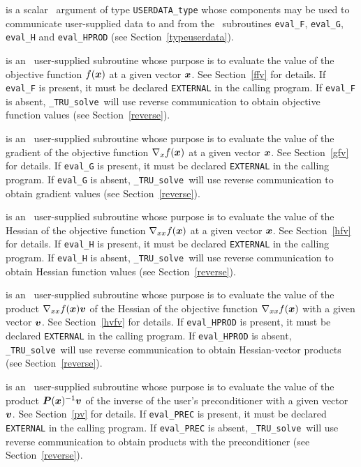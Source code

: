 \documentclass{galahad}
\newcommand{\packagename}{TRU}
\newcommand{\fullpackagename}{\libraryname\_\packagename}
\newcommand{\solver}{{\tt \fullpackagename\_solve}}
\begin{document}
\begin{description}
 is a scalar \intentinout\ argument of type
{\tt USERDATA\_type} whose components may be used
to communicate user-supplied data to and from the
\optional\ subroutines
{\tt eval\_F}, {\tt eval\_G},
{\tt eval\_H} and {\tt eval\_HPROD}
(see Section~\ref{typeuserdata}).

 is an \optional\
user-supplied subroutine whose purpose is to evaluate the value of the
objective function $f({\bm{x}})$ at a given vector ${\bm{x}}$.
See Section~\ref{ffv} for details.
If {\tt eval\_F} is present,
it must be declared {\tt EXTERNAL} in the calling program.
If {\tt eval\_F} is absent, \solver\ will use reverse communication to
obtain objective function values (see Section~\ref{reverse}).

 is an \optional\
user-supplied subroutine whose purpose is to evaluate the value of the
gradient of the objective function $\nabla_x f({\bm{x}})$ at a given vector ${\bm{x}}$.
See Section~\ref{gfv} for details.
If {\tt eval\_G} is present,
it must be declared {\tt EXTERNAL} in the calling program.
If {\tt eval\_G} is absent, \solver\ will use reverse communication to
obtain gradient values (see Section~\ref{reverse}).

 is an \optional\
user-supplied subroutine whose purpose is to evaluate the value of the
Hessian of the objective function $\nabla_{xx} f({\bm{x}})$ at a given vector ${\bm{x}}$.
See Section~\ref{hfv} for details.
If {\tt eval\_H} is present,
it must be declared {\tt EXTERNAL} in the calling program.
If {\tt eval\_H} is absent, \solver\ will use reverse communication to
obtain Hessian function values (see Section~\ref{reverse}).

\itt{eval\_HPROD} is an \optional\
user-supplied subroutine whose purpose is to evaluate the value of the
product $\nabla_{xx} f({\bm{x}}){\bm{v}}$ of the Hessian of the objective function
$\nabla_{xx} f({\bm{x}})$  with a given vector ${\bm{v}}$.
See Section~\ref{hvfv} for details.
If {\tt eval\_HPROD} is present,
it must be declared {\tt EXTERNAL} in the calling program.
If {\tt eval\_HPROD} is absent, \solver\ will use reverse communication to
obtain Hessian-vector products (see Section~\ref{reverse}).

\itt{eval\_PREC} is an \optional\
user-supplied subroutine whose purpose is to evaluate the value of the
product ${\bm{P}}({\bm{x}})^{-1}{\bm{v}}$ of the inverse of the user's preconditioner 
with a given vector ${\bm{v}}$. See Section~\ref{pv} for details.
If {\tt eval\_PREC} is present,
it must be declared {\tt EXTERNAL} in the calling program.
If {\tt eval\_PREC} is absent, \solver\ will use reverse communication to
obtain products with the preconditioner (see Section~\ref{reverse}).

\end{description}
\end{document}

